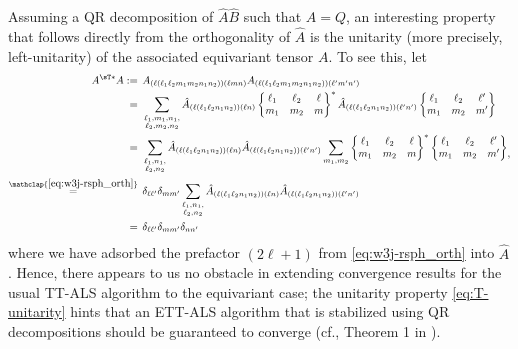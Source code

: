 \begin{remark}
    Assuming a QR decomposition of $\hat{A}\hat{B}$ such that $\hat{A} = Q$, an interesting property that follows directly from the orthogonality of $\hat{A}$ is the unitarity (more precisely, left-unitarity) of the associated equivariant tensor $A$.
    To see this, let
    \begin{equation}\label{eq:T-unitarity}
    \begin{aligned}
        A^{\sT\ast} A
        :=\;\,&
        A_{(\ell(\ell_1\ell_2 m_1m_2n_1n_2))(\ell mn)}
        A_{(\ell(\ell_1\ell_2 m_1m_2n_1n_2))(\ell' m'n')} \\
        =\;\,&
        \sum_{\substack{\ell_1,m_1,n_1, \\ \ell_2,m_2,n_2}}
        \hat{A}_{(\ell(\ell_1\ell_2 n_1n_2))(\ell n)}
        \begin{Bmatrix}
            \ell_1 & \ell_2 & \ell \\ m_1 & m_2 & m
        \end{Bmatrix}^\ast
        \hat{A}_{(\ell(\ell_1\ell_2 n_1n_2))(\ell' n')}
        \begin{Bmatrix}
            \ell_1 & \ell_2 & \ell' \\ m_1 & m_2 & m'
        \end{Bmatrix} \\
        =\;\,&
        \sum_{\substack{\ell_1,n_1, \\ \ell_2,n_2}}
        \hat{A}_{(\ell(\ell_1\ell_2 n_1n_2))(\ell n)}
        \hat{A}_{(\ell(\ell_1\ell_2 n_1n_2))(\ell' n')}
        \sum_{m_1,m_2}
        \begin{Bmatrix}
            \ell_1 & \ell_2 & \ell \\ m_1 & m_2 & m
        \end{Bmatrix}^\ast
        \begin{Bmatrix}
            \ell_1 & \ell_2 & \ell' \\ m_1 & m_2 & m'
        \end{Bmatrix} \\
        \overset{\mathclap{\eqref{eq:w3j-rsph_orth}}}{=}\;\,&
        \delta_{\ell\ell'} \delta_{mm'}
        \sum_{\substack{\ell_1,n_1, \\ \ell_2,n_2}}
        \hat{A}_{(\ell(\ell_1\ell_2 n_1n_2))(\ell n)}
        \hat{A}_{(\ell(\ell_1\ell_2 n_1n_2))(\ell' n')} \\
        =\;\,&
        \delta_{\ell\ell'} \delta_{mm'} \delta_{nn'}
    \end{aligned}
    ,
    \end{equation}
    where we have adsorbed the prefactor $(2\ell + 1)$ from \eqref{eq:w3j-rsph_orth} into $\hat{A}$.
    Hence, there appears to us no obstacle in extending convergence results for the usual TT-ALS algorithm to the equivariant case; the unitarity property \eqref{eq:T-unitarity} hints that an ETT-ALS algorithm that is stabilized using QR decompositions should be guaranteed to converge (cf., Theorem 1 in \citep{holtz_alternating_2012}).
\end{remark}

